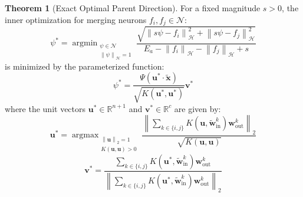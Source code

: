 \documentclass[11pt, a4paper, copyright, gdm]{google}
\newcommand{\norm}[1]{\left\lVert#1\right\rVert}
\newcommand{\uVect}{\boldsymbol{u}}
\newcommand{\vVect}{\boldsymbol{v}}
\newcommand{\wVect}{\boldsymbol{w}}
\newcommand{\xVect}{\boldsymbol{x}}
\newcommand{\calH}{\mathcal{H}}
\newcommand{\calN}{\mathcal{N}}
\newcommand{\R}{\mathbb{R}}
\DeclareMathOperator{\argmin}{argmin}
\DeclareMathOperator{\argmax}{argmax}
\theoremstyle{definition}
\newtheorem{theorem}{Theorem}[section]
\begin{document}
\begin{theorem}[Exact Optimal Parent Direction]
\label{thm:optimal_parent}
For a fixed magnitude $s > 0$, the inner optimization for merging neurons $f_i, f_j \in \calN$:
\begin{equation}
	\label{eq:inner_opt_exact}
    \psi^* = \argmin_{\substack{\psi \in \calN \\ \norm{\psi}_{\calH} = 1}} \frac{\sqrt{\norm{s \psi - f_i}_{\calH}^2 + \norm{s \psi - f_j}_{\calH}^2}}{E_a - \norm{f_i}_{\calH} - \norm{f_j}_{\calH} + s} 
\end{equation}
is minimized by the parameterized function:
\begin{equation}
\psi^* = \frac{\Psi(\uVect^* \cdot \tilde{\xVect})}{\sqrt{K(\uVect^*,\uVect^*)}} \vVect^*
\end{equation}
where the unit vectors $\uVect^* \in \R^{n+1}$ and $\vVect^* \in \R^c$ are given by:
\begin{equation}
\label{eq:opt_u_exact}
\uVect^* = \argmax_{\substack{\norm{\uVect}_2=1 \\ K(\uVect, \uVect) > 0}} \frac{\norm{\sum_{k \in \{i,j\}} K(\uVect, \tilde{\wVect}^k_{\text{in}}) \wVect^k_{\text{out}}}_2}{\sqrt{K(\uVect,\uVect)}}
\end{equation}
\begin{equation}
\vVect^* = \frac{\sum_{k \in \{i,j\}} K(\uVect^*, \tilde{\wVect}^k_{\text{in}}) \wVect^k_{\text{out}}}{\norm{\sum_{k \in \{i,j\}} K(\uVect^*, \tilde{\wVect}^k_{\text{in}}) \wVect^k_{\text{out}}}_2}
\end{equation}
\end{theorem}
\end{document}
